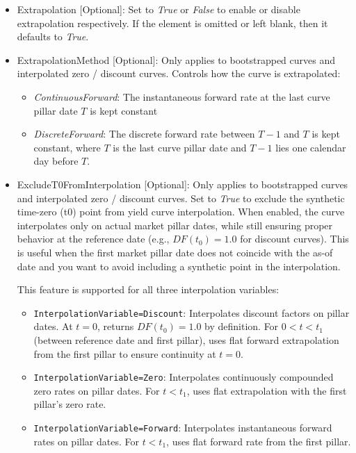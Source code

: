 \begin{itemize}
\item Extrapolation [Optional]: Set to \emph{True} or \emph{False} to enable or disable extrapolation respectively. If
the element is omitted or left blank, then it defaults to \emph{True}.

\item ExtrapolationMethod [Optional]: Only applies to bootstrapped curves and interpolated zero / discount curves.
Controls how the curve is extrapolated:
\begin{itemize}
\item \emph{ContinuousForward}: The instantaneous forward rate at the last curve pillar date $T$ is kept constant
\item \emph{DiscreteForward}: The discrete forward rate between $T-1$ and $T$ is kept constant, where $T$ is the last
curve pillar date and $T-1$ lies one calendar day before $T$.
\end{itemize}

\item ExcludeT0FromInterpolation [Optional]: Only applies to bootstrapped curves and interpolated zero / discount curves.
Set to \emph{True} to exclude the  synthetic time-zero (t0) point from yield curve interpolation. When enabled, the curve
interpolates only on actual market pillar dates, while still ensuring proper behavior at the reference date
(e.g., $DF(t_0) = 1.0$ for discount curves). This is useful when the first market pillar date does not coincide with the
as-of date and you want to avoid including a synthetic point in the interpolation.

This feature is supported for all three interpolation variables:
\begin{itemize}
  \item \lstinline!InterpolationVariable=Discount!: Interpolates discount factors on pillar dates. At $t=0$, returns
  $DF(t_0) = 1.0$ by definition. For $0 < t < t_1$ (between reference date and first pillar), uses flat forward
  extrapolation from the first pillar to ensure continuity at $t=0$.

  \item \lstinline!InterpolationVariable=Zero!: Interpolates continuously compounded zero rates on pillar dates.
  For $t < t_1$, uses flat extrapolation with the first pillar's zero rate.

  \item \lstinline!InterpolationVariable=Forward!: Interpolates instantaneous forward rates on pillar dates.
  For $t < t_1$, uses flat forward rate from the first pillar.
\end{itemize}


\end{itemize}
